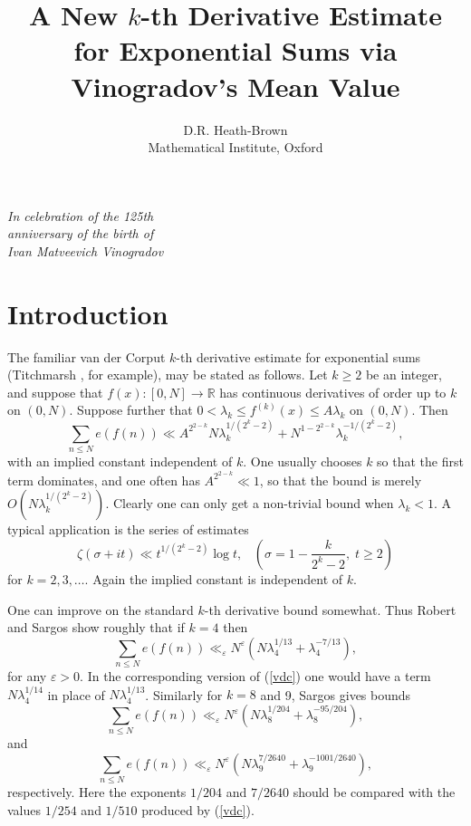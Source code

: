 \documentclass[a4paper,10pt]{article}
\newcommand{\R}{\mathbb{R}}
\newcommand{\ep}{\varepsilon}
\newcommand{\lk}{\lambda_k}
\newcommand{\beql}[1]{\begin{equation}\label{#1}}
\newcommand{\eeq}{\end{equation}}
\begin{document}
\title{A New $k$-th Derivative Estimate for Exponential Sums via
  Vinogradov's Mean Value}
\author{D.R. Heath-Brown\\Mathematical Institute, Oxford}
\date{}
\maketitle

\begin{flushright}
{\em In celebration of the 125th}\\
{\em anniversary of the birth of}\\
{\em Ivan Matveevich Vinogradov}
\end{flushright}
\section{Introduction}

The familiar van der Corput $k$-th derivative estimate for exponential
sums (Titchmarsh \cite[Theorems 5.9, 5.11, \& 5.13]{Titch}, for
example), may be stated as follows. Let $k\ge 2$ be an integer, and
suppose that $f(x):[0,N]\to\R$ has continuous
derivatives of order up to $k$ on $(0,N)$.
Suppose further that $0<\lambda_k\le f^{(k)}(x)\le A\lambda_k$ on
$(0,N)$. Then
\beql{vdc}
\sum_{n\le N}e(f(n))\ll A^{2^{2-k}}N\lambda_k^{1/(2^k-2)}
+N^{1-2^{2-k}}\lambda_k^{-1/(2^k-2)},
\eeq
with an implied constant independent of $k$. One usually
chooses $k$ so that the first term dominates, and one often has
$A^{2^{2-k}}\ll 1$, so that the bound is merely
$O(N\lambda_k^{1/(2^k-2)})$. Clearly one can only get a non-trivial
bound when $\lk<1$.  A typical application is the series of
estimates
\[\zeta(\sigma+it)\ll t^{1/(2^k-2)}\log t,\;\;\;
\left(\sigma=1-\frac{k}{2^k-2},\; t\ge 2\right)\]
for $k=2,3,\ldots$. Again the implied constant is independent of $k$.

One can improve on the standard $k$-th derivative bound somewhat.  Thus
Robert and Sargos \cite{RS} show roughly that if $k=4$ then
\[\sum_{n\le N}e(f(n))\ll_{\ep} N^{\ep}(N\lambda_4^{1/13}+\lambda_4^{-7/13}),\]
for any $\ep>0$.  In the corresponding version of (\ref{vdc}) one
would have a term $N\lambda_4^{1/14}$ in place of
$N\lambda_4^{1/13}$. Similarly for $k=8$ and 9, Sargos \cite[Theorems
3 \& 4]{Sarg} gives bounds
\[\sum_{n\le N}e(f(n))\ll_{\ep}
N^{\ep}(N\lambda_8^{1/204}+\lambda_8^{-95/204}),\]
and
\[\sum_{n\le N}e(f(n))\ll_{\ep}
N^{\ep}(N\lambda_9^{7/2640}+\lambda_9^{-1001/2640}),\]
respectively.  Here the exponents $1/204$ and $7/2640$ should be
compared with the values $1/254$ and $1/510$ produced by (\ref{vdc}).
\bigskip
\end{document}

